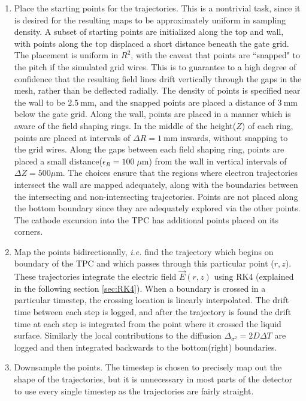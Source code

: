 \begin{enumerate}
    \item Place the starting points for the trajectories.
    This is a nontrivial task, since it is desired for the resulting maps to be approximately uniform in sampling density. 
    A subset of starting  points are initialized along the top and wall, with points along the top displaced a short distance beneath the gate grid.
    The placement is uniform in $R^2$, with the caveat that points are ``snapped" to the pitch if the simulated grid wires. This is to guarantee to a high degree of confidence that the resulting field lines drift vertically through the gaps in the mesh, rather than be deflected radially. 
    The density of points is specified near the wall to be $2.5\mathrm{~mm}$, and the snapped points are placed a distance of $3\mathrm{~mm}$ below the gate grid. 
    Along the wall, points are placed in a manner which is aware of the field shaping rings. 
    In the middle of the height($Z$) of each ring, points are placed at intervals of $\Delta R=1\mathrm{~mm}$ inwards, without snapping to the grid wires.
    Along the gaps between each field shaping ring, points are placed a small distance($\epsilon_R=100\;\mu \mathrm{m}$) from the wall in vertical intervals of $\Delta Z=500 \mu \mathrm{m}$.
    The choices ensure that the regions where electron trajectories intersect the wall are mapped adequately, along with the boundaries between the intersecting and non-intersecting trajectories.
    Points are not placed along the bottom boundary since they are adequately explored via the other points.
    The cathode excursion into the TPC has additional points placed on its corners.
    \item Map the points bidirectionally, \textit{i.e.} find the trajectory which begins on boundary of the TPC and which passes through this particular point ($r,z$). These trajectories integrate the electric field $\vec{E}(r,z)$ using RK4 (explained in the following section \ref{sec:RK4}).
    When a boundary is crossed in a particular timestep, the crossing location is linearly interpolated. The drift time between each step is logged, and after the trajectory is found the drift time at each step is integrated from the point where it crossed the liquid surface. 
    Similarly the local contributions to the diffusion $\Delta_{\sigma^2}=2D\Delta T$ are logged and then integrated backwards to the bottom(right) boundaries.
    \item Downsample the points.
    The timestep is chosen to precisely map out the shape of the trajectories, but it is unnecessary in most parts of the detector to use every single timestep as the trajectories are fairly straight.

\end{enumerate}
